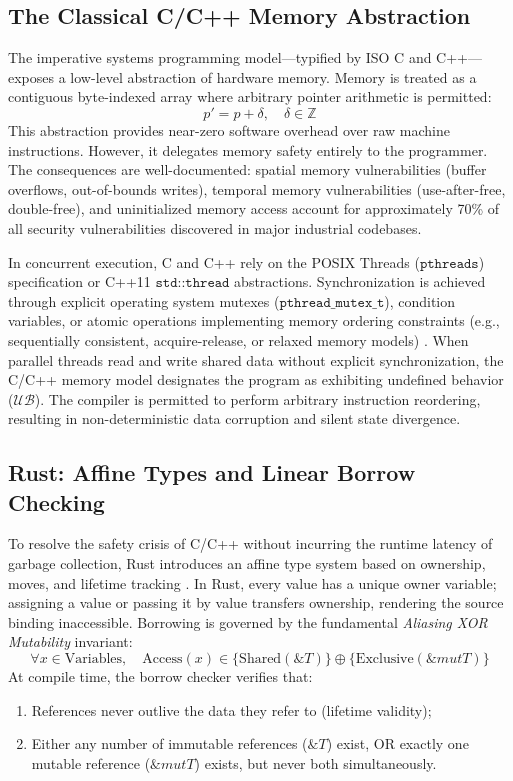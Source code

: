 \subsection{The Classical C/C++ Memory Abstraction}
The imperative systems programming model---typified by ISO C \cite{turing1937computable} and C++---exposes a low-level abstraction of hardware memory. Memory is treated as a contiguous byte-indexed array where arbitrary pointer arithmetic is permitted:
\begin{equation}
    p' = p + \delta, \quad \delta \in \mathbb{Z}
\end{equation}
This abstraction provides near-zero software overhead over raw machine instructions. However, it delegates memory safety entirely to the programmer. The consequences are well-documented: spatial memory vulnerabilities (buffer overflows, out-of-bounds writes), temporal memory vulnerabilities (use-after-free, double-free), and uninitialized memory access account for approximately 70\% of all security vulnerabilities discovered in major industrial codebases.

In concurrent execution, C and C++ rely on the POSIX Threads ($\texttt{pthreads}$) specification or C++11 $\texttt{std::thread}$ abstractions. Synchronization is achieved through explicit operating system mutexes ($\texttt{pthread\_mutex\_t}$), condition variables, or atomic operations implementing memory ordering constraints (e.g., sequentially consistent, acquire-release, or relaxed memory models) \cite{lamport1979make, herlihy1990linearizability}. When parallel threads read and write shared data without explicit synchronization, the C/C++ memory model designates the program as exhibiting undefined behavior ($\mathcal{UB}$). The compiler is permitted to perform arbitrary instruction reordering, resulting in non-deterministic data corruption and silent state divergence.

\subsection{Rust: Affine Types and Linear Borrow Checking}
To resolve the safety crisis of C/C++ without incurring the runtime latency of garbage collection, Rust introduces an affine type system based on ownership, moves, and lifetime tracking \cite{matsakis2014rust}. In Rust, every value has a unique owner variable; assigning a value or passing it by value transfers ownership, rendering the source binding inaccessible. Borrowing is governed by the fundamental \textit{Aliasing XOR Mutability} invariant:
\begin{equation}
    \forall x \in \text{Variables}, \quad \text{Access}(x) \in \{ \text{Shared}(\&T) \} \oplus \{ \text{Exclusive}(\&mut T) \}
\end{equation}
At compile time, the borrow checker verifies that:
\begin{enumerate}
    \item References never outlive the data they refer to (lifetime validity);
    \item Either any number of immutable references ($\&T$) exist, OR exactly one mutable reference ($\&mut T$) exists, but never both simultaneously.
\end{enumerate}

